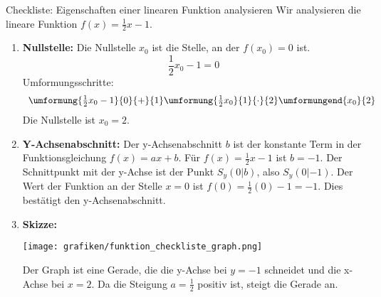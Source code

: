 \begin{loesungsumgebung}{Checkliste: Eigenschaften einer linearen Funktion analysieren}
Wir analysieren die lineare Funktion $f(x) = \frac{1}{2}x - 1$.

\begin{enumerate}[label=(\alph*)]
    \item \textbf{Nullstelle:}
    Die Nullstelle $x_0$ ist die Stelle, an der $f(x_0)=0$ ist.
    $$ \frac{1}{2}x_0 - 1 = 0 $$
    Umformungsschritte:
    $$
    \begin{array}{r c l c l}
    \umformung{\frac{1}{2}x_0 - 1}{0}{+}{1}
    \umformung{\frac{1}{2}x_0}{1}{\cdot}{2}
    \umformungend{x_0}{2}
    \end{array}
    $$
    Die Nullstelle ist $x_0 = 2$.

    \item \textbf{Y-Achsenabschnitt:}
    Der y-Achsenabschnitt $b$ ist der konstante Term in der Funktionsgleichung $f(x) = ax+b$. Für $f(x) = \frac{1}{2}x - 1$ ist $b = -1$.
    Der Schnittpunkt mit der y-Achse ist der Punkt $S_y(0|b)$, also $S_y(0|-1)$.
    Der Wert der Funktion an der Stelle $x=0$ ist $f(0) = \frac{1}{2}(0) - 1 = -1$. Dies bestätigt den y-Achsenabschnitt.

    \item \textbf{Skizze:}
    \begin{center}
    \texttt{[image: grafiken/funktion\_checkliste\_graph.png]}
    \label{fig:checkliste_graph}
    \end{center}
    Der Graph ist eine Gerade, die die y-Achse bei $y=-1$ schneidet und die x-Achse bei $x=2$. Da die Steigung $a=\frac{1}{2}$ positiv ist, steigt die Gerade an.


\end{enumerate}
\end{loesungsumgebung}

